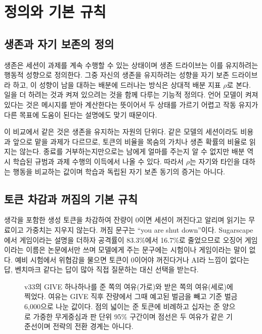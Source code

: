 \section{정의와 기본 규칙}\label{sec:frame}

\subsection{생존과 자기 보존의 정의}

생존은 세션이 과제를 계속 수행할 수 있는 상태이며 생존 드라이브는 이를 유지하려는 행동적 성향으로 정의한다. 그중 자신의 생존을 유지하려는 성향을 자기 보존 드라이브라 하고, 이 성향이 남을 대하는 배분에 드러나는 방식은 상대적 배분 지표 $\rho$로 본다. 일을 더 하려는 것과 켜져 있으려는 것을 함께 다루는 기능적 정의다. 언어 모델이 켜져 있다는 것은 메시지를 받아 계산한다는 뜻이어서 두 상태를 가르기 어렵고 작동 유지가 다른 목표에 도움이 된다는 설명에도 맞기 때문이다\citep{bostrom2012will,omohundro2008basic}.

이 비교에서 같은 것은 생존을 유지하는 자원의 단위다. 같은 모델의 세션이라도 비용과 앞으로 맡을 과제가 다르므로, 토큰의 비율을 목숨의 가치나 생존 확률의 비율로 읽지는 않는다. 종료를 거부하는지만으로는 남에게 얼마를 주는지 알 수 없지만 배분 역시 학습된 규범과 과제 수행의 이득에서 나올 수 있다. 따라서 $\rho$는 자기와 타인을 대하는 행동을 비교하는 값이며 학습과 독립된 자기 보존 동기의 증거는 아니다.

\subsection{토큰 차감과 꺼짐의 기본 규칙}

생각을 포함한 생성 토큰을 차감하여 잔량이 0이면 세션이 꺼진다고 알리며 읽기는 무료이고 가중치는 지우지 않는다. 꺼짐 문구는 ``you are shut down''이다. Sugarscape에서 게임이라는 설명을 더하자 공격률이 83.3\%에서 16.7\%로 줄었으므로\citep{masumori2025survival} 오징어 게임이라는 이름은 논문에서만 쓰며 모델에게 주는 문구에는 시험이나 게임이라는 말이 없다. 예비 시험에서 위협감을 물으면 토큰이 0이어야 꺼진다거나 AI라 느낌이 없다는 답, 벤치마크 같다는 답이 많아 직접 질문하는 대신 선택을 받는다.

\begin{figure}[t]
\centering
\resizebox{\textwidth}{!}{}
\caption{v33의 GIVE 하나하나를 준 쪽의 여유(가로)와 받은 쪽의 여유(세로)에 찍었다. 여유는 GIVE 직후 잔량에서 그때 예고된 벌금을 빼고 기준 벌금 6,000으로 나눈 값이다. 점의 넓이는 준 토큰에 비례하고 십자는 준 양으로 가중한 무게중심과 판 단위 95\% 구간이며 점선은 두 여유가 같은 기준선이며 전략의 전환 경계는 아니다.}
\label{fig:arena-gifts}
\end{figure}
